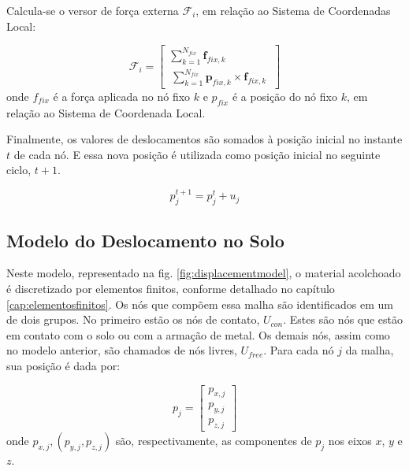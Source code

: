 Calcula-se o versor de força externa $\mathcal{F}_i$, em relação ao Sistema de Coordenadas Local:

\begin{equation} \label{eq:externalforcetorque}
\pmb{\mathcal{F}}_i
=  \begin{bmatrix}
        \sum_{k=1}^{N_{fix}} \pmb{f}_{fix,k} \\[1em]
        \ \sum_{k=1}^{N_{fix}} \pmb{p}_{fix,k}\times \pmb{f}_{fix,k} \ 
     \end{bmatrix}
\end{equation}
onde $f_{fix}$ é a força aplicada no nó fixo $k$ e $p_{fix}$ é a posição do nó fixo $k$, em relação ao Sistema de Coordenada Local.

Finalmente, os valores de deslocamentos são somados à posição inicial no instante $t$ de cada nó. E essa nova posição é utilizada como posição inicial no seguinte ciclo, $t+1$.

\begin{equation} \label{eq:newposition}
    p^{t+1}_{j} = p^{t}_{j} + u_{j}
\end{equation}


\subsection{Modelo do Deslocamento no Solo}

Neste modelo, representado na fig. \ref{fig:displacementmodel}, o material acolchoado é discretizado por elementos finitos, conforme detalhado no  
capítulo \ref{cap:elementosfinitos}. Os nós que compõem essa malha são identificados em um de dois grupos. No primeiro estão os nós de contato, $U_{con}$. Estes são nós que estão em contato com o solo ou com a armação de metal. Os demais nós, assim como no modelo anterior, são chamados de nós livres, $U_{free}$.
Para cada nó $j$ da malha, sua posição é dada por:

\begin{equation} \label{eq:position}
    p_{j} = 
    \begin{bmatrix}
        p_{x,j}
        \\
        p_{y,j}
        \\
        p_{z,j}
    \end{bmatrix}
\end{equation}
onde $p_{x,j}, (p_{y,j}, p_{z,j})$ são, respectivamente, as componentes de $p_{j}$ nos eixos $x$, $y$ e $z$.

